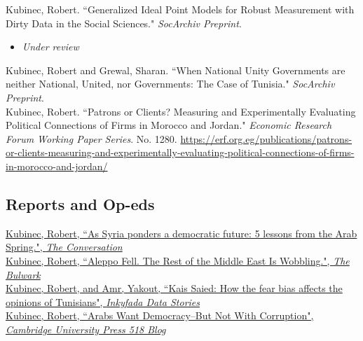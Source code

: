 \documentclass[11pt, a4paper]{article}
\newcommand{\years}[1]{\marginnote{\scriptsize #1}}
\begin{document}
\years{2025} Kubinec, Robert. ``Generalized Ideal Point Models for Robust Measurement with Dirty Data in the Social Sciences." \emph{SocArchiv Preprint}. \\

\begin{itemize}
	\item \emph{Under review}
\end{itemize}

\newpage

\years{2019} Kubinec, Robert and Grewal, Sharan. ``When National Unity Governments are neither National, United, nor Governments: The Case of Tunisia." \emph{SocArchiv Preprint}. \\

\years{2018} Kubinec, Robert. ``Patrons or Clients? Measuring and Experimentally Evaluating Political Connections of Firms in Morocco and Jordan." \emph{Economic Research Forum Working Paper Series}. No. 1280. \url{https://erf.org.eg/publications/patrons-or-clients-measuring-and-experimentally-evaluating-political-connections-of-firms-in-morocco-and-jordan/}\\

\subsection*{Reports and Op-eds}
\noindent

\years{2025}\href{https://theconversation.com/as-syria-ponders-a-democratic-future-5-lessons-from-the-arab-spring-246203}{Kubinec, Robert, ``As Syria ponders a democratic future: 5 lessons from the Arab Spring.", \emph{The Conversation}}\\

\years{2024}\href{https://www.thebulwark.com/p/aleppo-fell-the-rest-of-the-middle-east-is-wobbling/}{Kubinec, Robert, ``Aleppo Fell. The Rest of the Middle East Is Wobbling.", \emph{The Bulwark}}\\

\years{2023}\href{https://inkyfada.com/en/2023/10/27/kais-saied-fear-bias-opinions-tunisians/}{Kubinec, Robert, and Amr, Yakout, ``Kais Saied: How the fear bias affects the opinions of Tunisians", \emph{Inkyfada Data Stories}}\\

\years{2023}\href{https://www.cambridgeblog.org/2023/07/arabs-want-democracy-but-not-with-corruption/}{Kubinec, Robert, ``Arabs Want Democracy--But Not With Corruption", \emph{Cambridge University Press 518 Blog}}\\
\end{document}
